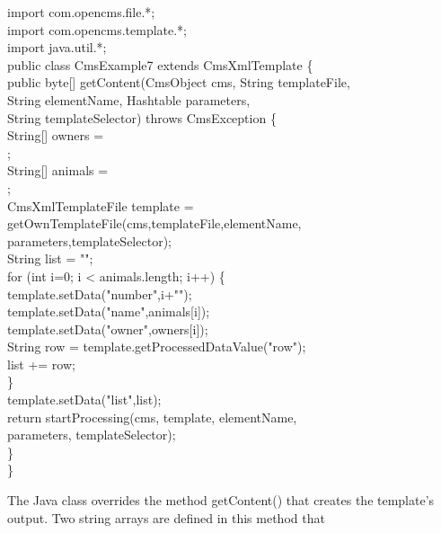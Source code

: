 \begin{java}
import com.opencms.file.*;\\
import com.opencms.template.*;\\
import java.util.*;\\

public class CmsExample7 extends CmsXmlTemplate \{\\
public byte[] getContent(CmsObject cms, String templateFile,\\
\jtabc        String elementName, Hashtable parameters,\\
\jtabc        String templateSelector) throws CmsException \{\\
\jtabb    String[] owners =\\
;\\
\jtabb    String[] animals =\\
;\\
\jtabb    CmsXmlTemplateFile template =\\
\jtabd        getOwnTemplateFile(cms,templateFile,elementName,\\
\jtabd        parameters,templateSelector);\\
\jtabb    String list = "";\\
\jtabb    for (int i=0; i < animals.length;  i++) \{\\
\jtabd        template.setData("number",i+"");\\
\jtabd        template.setData("name",animals[i]);\\
\jtabd        template.setData("owner",owners[i]);\\
\jtabd        String row = template.getProcessedDataValue("row");\\
\jtabe           list += row;\\
\jtabb    \}\\
\jtabb    template.setData("list",list);\\
\jtabb    return startProcessing(cms, template, elementName,\\
\jtabd        parameters, templateSelector);\\
\jtabb    \}\\
\}\\
\end{java}
The Java class overrides the method {\meth getContent()} that creates the
template's output. Two string arrays are defined in this method that
